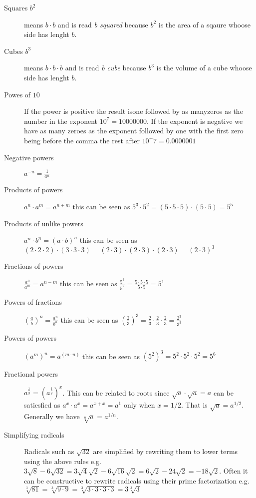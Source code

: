\begin{description}
\item [Squares $b^2$] means $b \cdot b$ and is read \emph{b squared} because
$b^2$ is the area of a sqaure whoose side has lenght $b$.
\item [Cubes $b^3$] means $b \cdot b \cdot b$ and is read \emph{b cube}
because $b^3$ is the volume of a cube whoose side has lenght $b$.
\item [Powes of $10$] If the power is positive the result isone followed by 
as manyzeros as the number in the exponent $10^7 = 10000000$. If the exponent 
is negative we have as many zeroes as the exponent followed by one with the 
first zero being before the comma the rest after $10^+7 = 0.0000001$
\item [Negative powers] $a^{-n} = \frac{1}{a^n}$
\item [Products of powers] $a^n \cdot a^m = a^{n+m}$ this can be seen as
$5^3 \cdot 5^2 = (5 \cdot 5 \cdot 5) \cdot (5 \cdot 5)= 5^5$
\item [Products of unlike powers] $a^n \cdot b^n = (a \cdot b)^n$ this can be
seen as $(2 \cdot 2 \cdot 2) \cdot (3 \cdot 3 \cdot 3) =
(2 \cdot 3) \cdot (2 \cdot 3) \cdot (2 \cdot 3) = (2 \cdot 3)^3$
\item [Fractions of powers] $\frac{a^n}{a^m} = a^{n-m}$ this can be seen as
$\frac{5^3}{5^2} = \frac{5 \cdot 5 \cdot 5}{5 \cdot 5} = 5^1$
\item [Powers of fractions] $\left(\frac{a}{b}\right)^n = \frac{a^n}{b^n}$ this can be seen as $\left(\frac{2}{3}\right)^3 = \frac{2}{3} \cdot \frac{2}{3} \cdot \frac{2}{3} = \frac{2^3}{3^3}$
\item [Powers of powers] $(a^m)^n = a^{(m \cdot n)}$ this can be seen as
$(5^2)^3 = 5^2 \cdot 5^2 \cdot 5^2 = 5^{6}$
\item [Fractional powers] $a^{\frac{x}{y}} = (a^{\frac{1}{y}})^x$. This can be
related to roots since $\sqrt{a} \cdot \sqrt{a} = a$ can be satiesfied as
$a^{x} \cdot a^{x} = a^{x+x} = a^{1}$ only when $x = 1/2$. That is
$\sqrt{a} = a^{1/2}$. Generally we have $\sqrt[n]{a} = a^{1/n}$.
\item [Simplifying radicals] Radicals such as $\sqrt{32}$ are simplified by
rewriting them to lower terms using the above rules e.g.
$3\sqrt{8} - 6\sqrt{32} = 3\sqrt{4}\sqrt{2} - 6\sqrt{16}\sqrt{2} =
6\sqrt{2} - 24\sqrt{2} = -18\sqrt{2}$. Often it can be constructive to rewrite
radicals using their prime factorization e.g. $\sqrt[3]{81} =
\sqrt[3]{9 \cdot 9} = \sqrt[3]{3 \cdot 3 \cdot 3 \cdot 3} = 3\sqrt[3]{3}$
\end{description}

